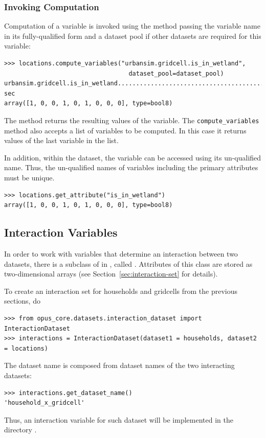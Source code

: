 \subsubsection{Invoking Computation}
\label{sec:compute-variables}
Computation of a variable is invoked using the  method
 passing the variable name in its fully-qualified
form and a dataset pool if other datasets are required for this variable:
 \label{page:compute-isnearcbd}
\variablesindex
\begin{verbatim}
>>> locations.compute_variables("urbansim.gridcell.is_in_wetland",
                                  dataset_pool=dataset_pool)
urbansim.gridcell.is_in_wetland..........................................0.0 sec
array([1, 0, 0, 1, 0, 1, 0, 0, 0], type=bool8)
\end{verbatim}

The method returns the resulting values of the variable. The
\verb|compute_variables| method also accepts a list of variables to be
computed.  In this case it returns values of the last variable in the list.

 In addition, within the dataset, the variable can be accessed using its un-qualified name.
 Thus, the un-qualified names of variables including the primary
 attributes must be unique.
\begin{verbatim}
>>> locations.get_attribute("is_in_wetland")
array([1, 0, 0, 1, 0, 1, 0, 0, 0], type=bool8)
\end{verbatim}

\subsection{Interaction Variables}
\label{sec:interactions}

In order to work with variables \variablesindex that determine an
interaction between two datasets, \datasetindex there is a subclass of
 in , called
. Attributes of this class are stored as
two-dimensional arrays (see Section~\ref{sec:interaction-set} for details).

To create an interaction set for households and gridcells from the previous
sections, do
\begin{verbatim}
>>> from opus_core.datasets.interaction_dataset import InteractionDataset
>>> interactions = InteractionDataset(dataset1 = households, dataset2 = locations)
\end{verbatim}
The dataset name is composed from dataset names of the two interacting datasets: \datasetindex
\begin{verbatim}
>>> interactions.get_dataset_name()
'household_x_gridcell'
\end{verbatim}
Thus, an interaction variable \variablesindex for such dataset \datasetindex will be implemented in the
directory .

